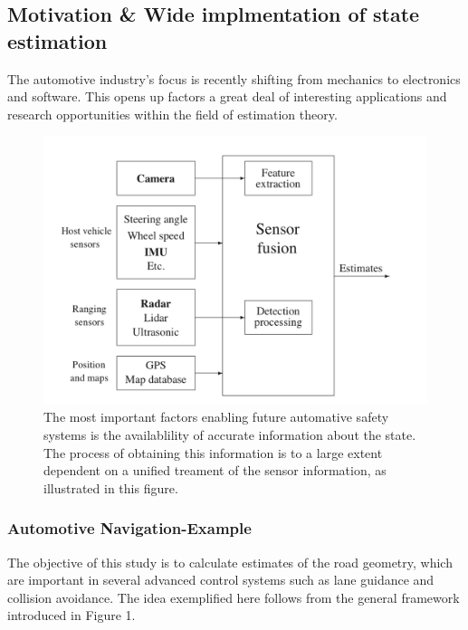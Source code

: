 \documentclass[11pt,oneside,a4paper]{article}
\begin{document}
\subsection{Motivation \& Wide implmentation of state estimation}
The automotive industry's focus is recently shifting from mechanics to electronics and software. This opens up factors
a great deal of interesting applications and research opportunities within the field of estimation theory.
\begin{figure}[H]
  \begin{center}
  \includegraphics[height=0.3\textheight]{./source/1.png}
  \end{center}
  \caption{ The most important factors enabling future automative safety systems
  is the availablility of accurate information about the state. The process of obtaining
  this information is to a large extent dependent on a unified treament of the sensor information, as illustrated
  in this figure.}
  \label{}
\end{figure}
\subsubsection{Automotive Navigation-Example}
The objective of this study is to calculate estimates of the road geometry,
which are important in several advanced control systems such as lane guidance
and collision avoidance. The idea exemplified here follows from the general framework introduced in Figure 1.
\end{document}
